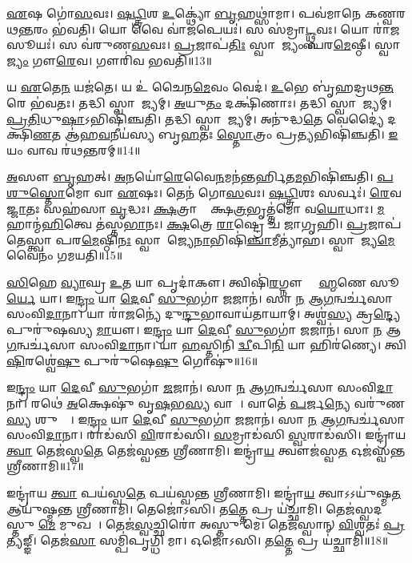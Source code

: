 \ul{𑌏}𑌷 𑌗𑍋॑\ul{𑌸}𑌵𑌃।
\ul{𑌷}\ul{𑌟𑍍𑌤𑍍𑌰𑌿}\ul{}𑌶 \ul{𑌉}𑌕𑍍𑌥𑍍𑌯𑍋॑ \ul{𑌬𑍃}𑌹𑌥𑍍𑌸𑌾॑𑌮𑌾।
𑌪𑌵॑𑌮𑌾𑌨𑍇 𑌕𑌣𑍍𑌵𑌰𑌥\ul{𑌨𑍍𑌤}𑌰𑌂 𑌭॑𑌵𑌤𑌿।
𑌯𑍋 𑌵𑍈 𑌵𑌾॑\ul{𑌜}𑌪𑍇𑌯𑌃॑।
𑌸 𑌸॑𑌮𑍍𑌰𑌾\ul{𑌟𑍍𑌥𑍍𑌸}𑌵𑌃।
𑌯𑍋 𑌰𑌾॑\ul{𑌜}𑌸𑍂𑌯𑌃॑।
𑌸 𑌵॑𑌰𑍁𑌣\ul{𑌸}𑌵𑌃।
\ul{𑌪𑍍𑌰}𑌜𑌾𑌪॑\ul{𑌤𑌿𑌃} 𑌸𑍍𑌵𑌾𑌰𑌾᳚𑌜𑍍𑌯𑌂 𑌪𑌰\ul{𑌮𑍇}𑌷𑍍𑌠𑍀।
𑌸𑍍𑌵𑌾𑌰𑌾᳚\ul{𑌜𑍍𑌯𑌂} 𑌗𑍗\ul{𑌰𑍇}𑌵।
𑌗𑍗𑌰𑌿॑𑌵 𑌭𑌵𑌤𑌿॥13॥

𑌯 \ul{𑌏}𑌤𑍇\ul{𑌨} 𑌯𑌜॑𑌤𑍇।
𑌯 𑌉॑ 𑌚𑍈𑌨\ul{𑌮𑍇}𑌵𑌂 𑌵𑍇𑌦॑।
\ul{𑌉}𑌭𑍇 𑌬𑍃॑𑌹𑌦𑍍𑌰𑌥\ul{𑌨𑍍𑌤}𑌰𑍇 𑌭॑𑌵𑌤𑌃।
𑌤𑌦𑍍𑌧𑌿 𑌸𑍍𑌵𑌾𑌰𑌾᳚𑌜𑍍𑌯𑌮𑍍।
\ul{𑌅}𑌯𑍁\ul{𑌤𑌂} 𑌦𑌕𑍍𑌷𑌿॑𑌣𑌾𑌃।
𑌤𑌦𑍍𑌧𑌿 𑌸𑍍𑌵𑌾𑌰𑌾᳚𑌜𑍍𑌯𑌮𑍍।
\ul{𑌪𑍍𑌰}\ul{𑌤𑌿}𑌧𑍁\ul{𑌷𑌾}\-𑌽𑌭𑌿𑌷𑌿॑𑌞𑍍𑌚𑌤𑌿।
𑌤𑌦𑍍𑌧𑌿 𑌸𑍍𑌵𑌾𑌰𑌾᳚𑌜𑍍𑌯𑌮𑍍।
𑌅𑌨𑍁॑𑌦𑍍𑌧\ul{𑌤𑍇} 𑌵𑍇𑌦𑍍𑌯𑍈॑ 𑌦𑌕𑍍𑌷𑌿\ul{𑌣}𑌤 𑌆॑𑌹\ul{𑌵}𑌨𑍀𑌯॑𑌸𑍍𑌯 𑌬𑍃\ul{𑌹}𑌤𑌃 \ul{𑌸𑍍𑌤𑍋}𑌤𑍍𑌰𑌂 𑌪𑍍𑌰\ul{𑌤𑍍𑌯}𑌭𑌿𑌷𑌿॑𑌞𑍍𑌚𑌤𑌿।
\ul{𑌇}𑌯𑌂 𑌵𑌾𑌵 𑌰॑𑌥\ul{𑌨𑍍𑌤}𑌰𑌮𑍍॥14॥

\ul{𑌅}𑌸𑍗 \ul{𑌬𑍃}𑌹𑌤𑍍।
\ul{𑌅}𑌨𑌯𑍋॑\ul{𑌰𑍇}𑌵𑍈\ul{𑌨}𑌮𑌨॑𑌨𑍍𑌤𑌰𑍍\mbox{}𑌹𑌿𑌤\ul{𑌮}𑌭𑌿𑌷𑌿॑𑌞𑍍𑌚𑌤𑌿।
\ul{𑌪}\ul{𑌶𑍁}\ul{𑌸𑍍𑌤𑍋}𑌮𑍋 𑌵𑌾 \ul{𑌏}𑌷𑌃।
𑌤𑍇𑌨॑ 𑌗𑍋\ul{𑌸}𑌵𑌃।
\ul{𑌷}\ul{𑌟𑍍𑌤𑍍𑌰𑌿}\ul{}𑌶𑌃 𑌸𑌰𑍍𑌵𑌃॑।
\ul{𑌰𑍇}𑌵\ul{𑌜𑍍𑌜𑌾}𑌤𑌃 𑌸𑌹॑𑌸𑌾 \ul{𑌵𑍃}𑌦𑍍𑌧𑌃।
\ul{𑌕𑍍𑌷}𑌤𑍍𑌰𑌾𑌣𑌾𑌂᳚ 𑌕𑍍𑌷\ul{𑌤𑍍𑌰}𑌭𑍃𑌤𑍍𑌤॑𑌮𑍋 𑌵\ul{𑌯𑍋}𑌧𑌾𑌃।
\ul{𑌮}𑌹𑌾𑌨𑍍𑌮॑\ul{𑌹𑌿}𑌤𑍍𑌵𑍇 𑌤॑𑌸𑍍𑌤\ul{𑌭𑌾}𑌨𑌃।
\ul{𑌕𑍍𑌷}𑌤𑍍𑌰𑍇 \ul{𑌰𑌾}𑌷𑍍𑌟𑍍𑌰𑍇 𑌚॑ 𑌜𑌾𑌗𑍃𑌹𑌿।
\ul{𑌪𑍍𑌰}𑌜𑌾𑌪॑𑌤𑍇𑌸𑍍𑌤𑍍𑌵𑌾 𑌪𑌰\ul{𑌮𑍇}𑌷𑍍𑌠𑌿\ul{𑌨𑌃} 𑌸𑍍𑌵𑌾𑌰𑌾᳚𑌜𑍍𑌯𑍇\ul{𑌨𑌾}𑌭𑌿𑌷𑌿॑\ul{𑌞𑍍𑌚𑌾}𑌮𑍀𑌤𑍍𑌯𑌾॑𑌹।
𑌸𑍍𑌵𑌾𑌰𑌾᳚𑌜𑍍𑌯\ul{𑌮𑍇}𑌵𑍈𑌨𑌂॑ 𑌗𑌮𑌯𑌤𑌿॥15॥\anuvakamend[\ul{𑌇}\ul{𑌵} \ul{𑌭}\ul{𑌵}\ul{𑌤𑌿} \ul{𑌰}\ul{𑌥}\ul{𑌨𑍍𑌤}𑌰\ul{𑌮𑌾}𑌹𑍈𑌕𑌂॑ 𑌚]

\ul{𑌸𑌿}\ul{}𑌹𑍇 \ul{𑌵𑍍𑌯𑌾}𑌘𑍍𑌰 \ul{𑌉}𑌤 𑌯𑌾 𑌪𑍃𑌦𑌾॑𑌕𑍗।
𑌤𑍍𑌵𑌿𑌷𑌿॑\ul{𑌰}𑌗𑍍𑌨𑍗 𑌬𑍍𑌰𑌾᳚\ul{𑌹𑍍𑌮}𑌣𑍇 𑌸𑍂\ul{𑌰𑍍𑌯𑍇} 𑌯𑌾।
𑌇\ul{𑌨𑍍𑌦𑍍𑌰𑌂} 𑌯𑌾 \ul{𑌦𑍇}𑌵𑍀 \ul{𑌸𑍁}𑌭𑌗𑌾॑ \ul{𑌜}𑌜𑌾𑌨॑।
𑌸𑌾 \ul{𑌨} 𑌆\ul{𑌗}𑌨𑍍𑌵𑌰𑍍𑌚॑𑌸𑌾 𑌸𑌂𑌵𑌿\ul{𑌦𑌾}𑌨𑌾।
𑌯𑌾 𑌰𑌾॑\ul{𑌜}𑌨𑍍𑌯𑍇॑ 𑌦𑍁\ul{𑌨𑍍𑌦𑍁}𑌭𑌾𑌵𑌾𑌯॑𑌤𑌾𑌯𑌾𑌮𑍍।
𑌅𑌶𑍍𑌵॑\ul{𑌸𑍍𑌯} 𑌕𑍍𑌰\ul{𑌨𑍍𑌦𑍍𑌯𑍇} 𑌪𑍁𑌰𑍁॑𑌷𑌸𑍍𑌯 \ul{𑌮𑌾}𑌯𑍗।
𑌇\ul{𑌨𑍍𑌦𑍍𑌰𑌂} 𑌯𑌾 \ul{𑌦𑍇}𑌵𑍀 \ul{𑌸𑍁}𑌭𑌗𑌾॑ \ul{𑌜}𑌜𑌾𑌨॑।
𑌸𑌾 \ul{𑌨} 𑌆\ul{𑌗}𑌨𑍍𑌵𑌰𑍍𑌚॑𑌸𑌾 𑌸𑌂𑌵𑌿\ul{𑌦𑌾}𑌨𑌾।
𑌯𑌾 \ul{𑌹}𑌸𑍍𑌤𑌿𑌨𑌿॑ \ul{𑌦𑍍𑌵𑍀}𑌪𑌿\ul{𑌨𑌿} 𑌯𑌾 𑌹𑌿𑌰॑𑌣𑍍𑌯𑍇।
𑌤𑍍𑌵𑌿\ul{𑌷𑌿}𑌰𑌶𑍍𑌵𑍇॑\ul{𑌷𑍁} 𑌪𑍁𑌰𑍁॑𑌷𑍇\ul{𑌷𑍁} 𑌗𑍋𑌷𑍁॑॥16॥

𑌇\ul{𑌨𑍍𑌦𑍍𑌰𑌂} 𑌯𑌾 \ul{𑌦𑍇}𑌵𑍀 \ul{𑌸𑍁}𑌭𑌗𑌾॑ \ul{𑌜}𑌜𑌾𑌨॑।
𑌸𑌾 \ul{𑌨} 𑌆\ul{𑌗}𑌨𑍍𑌵𑌰𑍍𑌚॑𑌸𑌾 𑌸𑌂𑌵𑌿\ul{𑌦𑌾}𑌨𑌾।
𑌰𑌥𑍇॑ \ul{𑌅}𑌕𑍍𑌷𑍇𑌷𑍁॑ 𑌵𑍃\ul{𑌷}𑌭\ul{𑌸𑍍𑌯} 𑌵𑌾𑌜𑍇᳚।
𑌵𑌾𑌤𑍇॑ \ul{𑌪}𑌰𑍍𑌜\ul{𑌨𑍍𑌯𑍇} 𑌵𑌰𑍁॑𑌣\ul{𑌸𑍍𑌯} 𑌶𑍁𑌷𑍍𑌮𑍇᳚।
𑌇\ul{𑌨𑍍𑌦𑍍𑌰𑌂} 𑌯𑌾 \ul{𑌦𑍇}𑌵𑍀 \ul{𑌸𑍁}𑌭𑌗𑌾॑ \ul{𑌜}𑌜𑌾𑌨॑।
𑌸𑌾 \ul{𑌨} 𑌆\ul{𑌗}𑌨𑍍𑌵𑌰𑍍𑌚॑𑌸𑌾 𑌸𑌂𑌵𑌿\ul{𑌦𑌾}𑌨𑌾।
𑌰𑌾𑌡॑𑌸𑌿 \ul{𑌵𑌿}𑌰𑌾𑌡॑𑌸𑌿।
\ul{𑌸}𑌮𑍍𑌰𑌾𑌡॑𑌸𑌿 \ul{𑌸𑍍𑌵}𑌰𑌾𑌡॑𑌸𑌿।
𑌇𑌨𑍍𑌦𑍍𑌰𑌾॑𑌯 \ul{𑌤𑍍𑌵𑌾} 𑌤𑍇𑌜॑𑌸𑍍𑌵\ul{𑌤𑍇} 𑌤𑍇𑌜॑𑌸𑍍𑌵𑌨𑍍𑌤 𑌶𑍍𑌰𑍀𑌣𑌾𑌮𑌿।
𑌇𑌨𑍍𑌦𑍍𑌰𑌾॑\ul{𑌯} 𑌤𑍍𑌵𑍗𑌜॑𑌸𑍍𑌵\ul{𑌤} 𑌓𑌜॑𑌸𑍍𑌵𑌨𑍍𑌤 𑌶𑍍𑌰𑍀𑌣𑌾𑌮𑌿॥17॥

𑌇𑌨𑍍𑌦𑍍𑌰𑌾॑𑌯 \ul{𑌤𑍍𑌵𑌾} 𑌪𑌯॑𑌸𑍍𑌵\ul{𑌤𑍇} 𑌪𑌯॑𑌸𑍍𑌵𑌨𑍍𑌤 𑌶𑍍𑌰𑍀𑌣𑌾𑌮𑌿।
𑌇𑌨𑍍𑌦𑍍𑌰𑌾॑\ul{𑌯} 𑌤𑍍𑌵𑌾\-𑌽𑌽𑌯𑍁॑𑌷𑍍𑌮\ul{𑌤} 𑌆𑌯𑍁॑𑌷𑍍𑌮𑌨𑍍𑌤 𑌶𑍍𑌰𑍀𑌣𑌾𑌮𑌿।
𑌤𑍇𑌜𑍋॑𑌽𑌸𑌿।
𑌤\ul{𑌤𑍍𑌤𑍇} 𑌪𑍍𑌰 𑌯॑𑌚𑍍𑌛𑌾𑌮𑌿।
𑌤𑍇𑌜॑𑌸𑍍𑌵𑌦𑌸𑍍𑌤𑍁 \ul{𑌮𑍇} 𑌮𑍁𑌖𑌮𑍍᳚।
𑌤𑍇𑌜॑\ul{𑌸𑍍𑌵}𑌚𑍍𑌛𑌿𑌰𑍋॑ 𑌅𑌸𑍍𑌤𑍁 𑌮𑍇।
𑌤𑍇𑌜॑𑌸𑍍𑌵𑌾𑌨𑍍 \ul{𑌵𑌿}𑌶𑍍𑌵𑌤𑌃॑ \ul{𑌪𑍍𑌰}𑌤𑍍𑌯𑌙𑍍𑌙𑍍।
𑌤𑍇𑌜॑\ul{𑌸𑌾} 𑌸𑌮𑍍𑌪𑌿॑𑌪𑍃𑌗𑍍𑌧𑌿 𑌮𑌾।
𑌓𑌜𑍋॑𑌽𑌸𑌿।
𑌤\ul{𑌤𑍍𑌤𑍇} 𑌪𑍍𑌰 𑌯॑𑌚𑍍𑌛𑌾𑌮𑌿॥18॥

